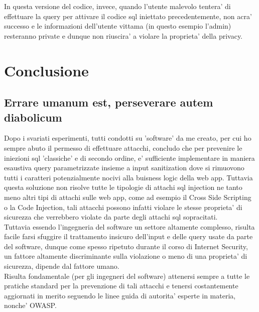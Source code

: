 \documentclass{book}
\begin{document}
In questa versione del codice, invece, quando l'utente malevolo tentera' di effettuare la query per attivare il codice sql iniettato precedentemente,
non acra' successo e le informazioni dell'utente vittama (in questo esempio l'admin) resteranno private e dunque non riuscira' a violare la proprieta'
della privacy.
\chapter{Conclusione}
\section{Errare umanum est, perseverare autem diabolicum}
Dopo i svariati esperimenti, tutti condotti su 'software' da me creato, per cui ho sempre abuto il permesso di effettuare attacchi,
concludo che per prevenire le iniezioni sql 'classiche' e di secondo ordine, e' sufficiente implementare in maniera esaustiva query
parametrizzate insieme a input sanitization dove si rimuovono tutti i caratteri potenzialmente nocivi alla buisness logic della web app.
Tuttavia questa soluzione non risolve tutte le tipologie di attachi sql injection ne tanto meno altri tipi di attachi sulle web app,
come ad esempio il Cross Side Scripting o la Code Injection, tali attacchi possono infatti violare le stesse proprieta' di sicurezza
che verrebbero violate da parte degli attachi sql sopracitati.
\\
Tuttavia essendo l'ingegneria del software un settore altamente complesso, risulta facile farsi sfuggire il trattamento insicuro dell'input e delle 
query usate da parte del software, dunque come spesso ripetuto durante il corso di Internet Security, un fattore altamente discriminante sulla violazione
o meno di una proprieta' di sicurezza, dipende dal fattore umano.
\\
Risulta fondamentale (per gli ingegneri del software) attenersi sempre a tutte le pratiche standard per la prevenzione di tali attacchi
e tenersi costantemente aggiornati in merito seguendo le linee guida di autorita' esperte in materia, nonche' OWASP.
\end{document}
